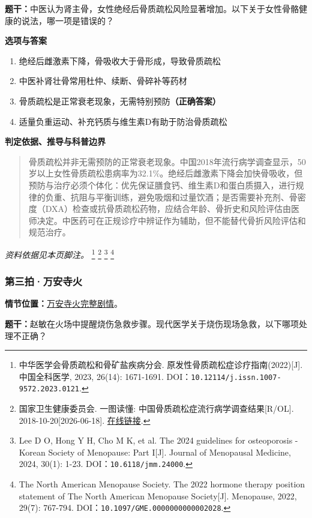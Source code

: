 \textbf{题干：}中医认为肾主骨，女性绝经后骨质疏松风险显著增加。以下关于女性骨骼健康的说法，哪一项是错误的？

\textbf{选项与答案}
\begin{enumerate}[label=\Alph*.,leftmargin=*]
  \item 绝经后雌激素下降，骨吸收大于骨形成，导致骨质疏松
  \item 中医补肾壮骨常用杜仲、续断、骨碎补等药材
  \item 骨质疏松是正常衰老现象，无需特别预防\textbf{（正确答案）}
  \item 适量负重运动、补充钙质与维生素D有助于防治骨质疏松
\end{enumerate}
\textbf{判定依据、推导与科普边界}
\begin{quote}骨质疏松并非无需预防的正常衰老现象。中国2018年流行病学调查显示，50岁以上女性骨质疏松患病率为32.1\%。绝经后雌激素下降会加快骨吸收，但预防与治疗必须个体化：优先保证膳食钙、维生素D和蛋白质摄入，进行规律的负重、抗阻与平衡训练，避免吸烟和过量饮酒；是否需要补充剂、骨密度（DXA）检查或抗骨质疏松药物，应结合年龄、骨折史和风险评估由医师决定。中医药可在正规诊疗中辨证作为辅助，但不能替代骨折风险评估和规范治疗。\end{quote}
\noindent\textit{资料依据见本页脚注。}
\footnote{中华医学会骨质疏松和骨矿盐疾病分会. 原发性骨质疏松症诊疗指南(2022)[J]. 中国全科医学, 2023, 26(14): 1671-1691. DOI：\nolinkurl{10.12114/j.issn.1007-9572.2023.0121}.}
\footnote{国家卫生健康委员会. 一图读懂: 中国骨质疏松症流行病学调查结果[R/OL]. 2018-10-20[2026-06-18]. \href{https://www.nhc.gov.cn/wjw/zcjd/201810/1aee4c12bec7415cbebfe7eacbc09552.shtml}{在线链接}.}
\footnote{Lee D O, Hong Y H, Cho M K, et al. The 2024 guidelines for osteoporosis - Korean Society of Menopause: Part I[J]. Journal of Menopausal Medicine, 2024, 30(1): 1-23. DOI：\nolinkurl{10.6118/jmm.24000}.}
\footnote{The North American Menopause Society. The 2022 hormone therapy position statement of The North American Menopause Society[J]. Menopause, 2022, 29(7): 767-794. DOI：\nolinkurl{10.1097/GME.0000000000002028}.}

\subsubsection{第三拍·万安寺火}\label{question:zhaomin:3}
\textbf{情节位置：}\hyperref[plot:zhaomin:3]{万安寺火完整剧情}。

\textbf{题干：}赵敏在火场中提醒烧伤急救步骤。现代医学关于烧伤现场急救，以下哪项处理不正确？

